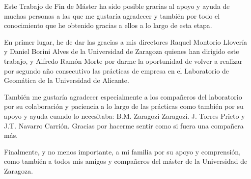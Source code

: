 
\setlength{\parskip}{0.5cm}
\begin{acknowledgements}      

Este Trabajo de Fin de Máster ha sido posible gracias al apoyo y ayuda de muchas personas a las que me gustaría agradecer y también por todo el conocimiento que he obtenido gracias a ellos a lo largo de esta etapa.

En primer lugar, he de dar las gracias a mis directores Raquel Montorio Llovería y Daniel Borini Alves de la Universidad de Zaragoza quienes han dirigido este trabajo, y Alfredo Ramón Morte por darme la oportunidad de volver a realizar por segundo año consecutivo las prácticas de empresa en el Laboratorio de Geomática de la Universidad de Alicante.

También me gustaría agradecer especialmente a los compañeros del laboratorio por su colaboración y paciencia a lo largo de las prácticas como también por su apoyo y ayuda cuando lo necesitaba: B.M. Zaragozí Zaragozí. J. Torres Prieto y J.T. Navarro Carrión. Gracias por hacerme sentir como si fuera una compañera más.

Finalmente, y no menos importante, a mi familia por su apoyo y comprensión, como también a todos mis amigos y compañeros del máster de la Universidad de Zaragoza.

\end{acknowledgements}
